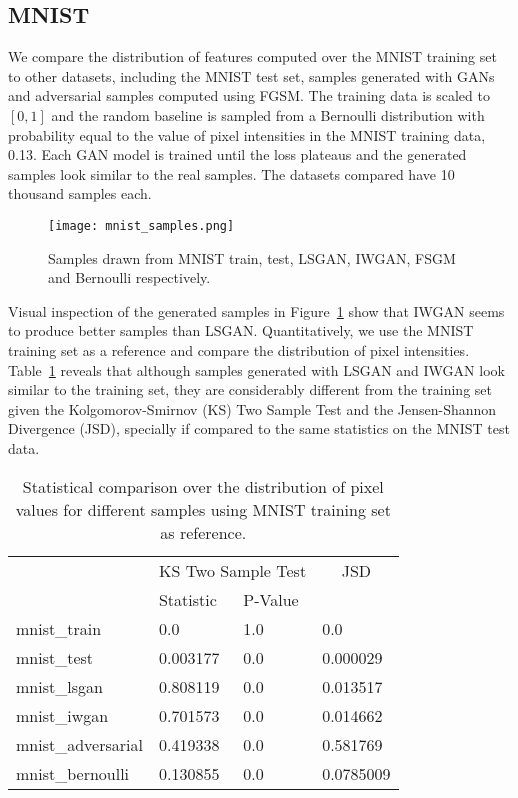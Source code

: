 \subsection{MNIST}
We compare the distribution of features computed over the MNIST training set 
to other datasets, including
the MNIST test set, samples generated with GANs and adversarial samples computed 
using FGSM. The training data is
scaled to $[0, 1]$ and the random baseline is sampled from a Bernoulli distribution with 
probability equal to the value of pixel intensities in the
MNIST training data, 0.13. Each GAN model is trained until the loss plateaus 
and the generated samples look similar to the real samples. The datasets
compared have 10 thousand samples each.

\begin{figure}[!h]
  \begin{center}
  \texttt{[image: mnist\_samples.png]}
  \caption{Samples drawn from MNIST train, test,
LSGAN, IWGAN, FSGM and Bernoulli respectively.}
  \label{fig:mnist_samples}
  \end{center}
\end{figure}

Visual inspection of the generated samples in
Figure~\ref{fig:mnist_samples} show that IWGAN seems to produce better samples
than LSGAN. Quantitatively, we use the MNIST training set as a reference and compare the
distribution of pixel intensities.  Table~\ref{tbl:mnist_pixel} reveals that
although samples generated with LSGAN and IWGAN look similar to the training
set, they are considerably different from the training set given the Kolgomorov-Smirnov (KS) Two
Sample Test and the Jensen-Shannon Divergence (JSD), specially if compared to
the same statistics on the MNIST test data. 

\begin{table}[!h]
\centering
\begin{tabular}{l|ll|l|}
                   & \multicolumn{2}{c|}{\cellcolor[HTML]{C0C0C0}KS Two Sample Test} & \multicolumn{1}{c|}{\cellcolor[HTML]{C0C0C0}JSD} \\
                   & Statistic   & P-Value   &                \\
mnist\_train       & 0.0         & 1.0       & 0.0            \\
mnist\_test        & 0.003177    & 0.0       & 0.000029       \\
mnist\_lsgan       & 0.808119    & 0.0       & 0.013517       \\
mnist\_iwgan       & 0.701573    & 0.0       & 0.014662       \\
mnist\_adversarial & 0.419338    & 0.0       & 0.581769       \\
mnist\_bernoulli   & 0.130855    & 0.0       & 0.0785009      
\end{tabular}
\caption{Statistical comparison over the distribution of pixel values for
different samples using MNIST training set as reference.}
\label{tbl:mnist_pixel}
\end{table}

